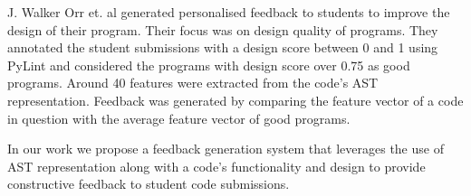 J. Walker Orr et. al \cite{T} generated personalised feedback to students to improve the design of their program. Their focus was on design quality of programs. They annotated the student submissions with a design score between 0 and 1 using PyLint and considered the programs with design score over 0.75 as good programs. Around 40 features were extracted from the code's AST representation. Feedback was generated by comparing the feature vector of a code in question with the average feature vector of good programs.

In our work we propose a feedback generation system that leverages the use of AST representation along with a code's functionality and design to provide constructive feedback to student code submissions. 


 




